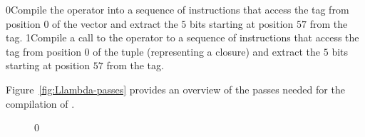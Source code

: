 \documentclass[7x10]{TimesAPriori_MIT}%
\def\racketEd{0}
\def\pythonEd{1}
\providecommand{\BookEdition}{1}
\let\edition\BookEdition
\newcommand{\racket}[1]{{\if\edition\racketEd{#1}\fi}}
\newcommand{\pythonColor}[0]{}
\newcommand{\python}[1]{{\if\edition\pythonEd\pythonColor #1\fi}}
\numberwithin{theorem}{chapter}
\numberwithin{definition}{chapter}
\numberwithin{equation}{chapter}
\begin{document}
\racket{Compile the  operator into a sequence of
instructions that access the tag from position $0$ of the vector and
extract the $5$ bits starting at position $57$ from the tag.}
%
\python{Compile a call to the  operator to a sequence of
instructions that access the tag from position $0$ of the tuple
(representing a closure) and extract the $5$ bits starting at position
$57$ from the tag.}

Figure~\ref{fig:Llambda-passes} provides an overview of the passes
needed for the compilation of \LangLam{}.

\begin{figure}[bthp]
  \begin{tcolorbox}[colback=white]
{\if\edition\racketEd    
{}}
\end{tcolorbox}
\end{figure}
\end{document}
